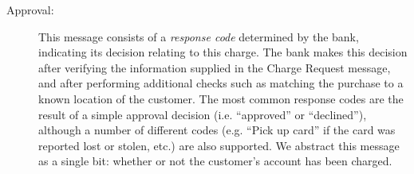 \begin{description}
\item[Approval:]
This message consists of a \emph{response code} determined by the bank, indicating its decision relating to this charge.
The bank makes this decision after verifying the information supplied in the Charge Request message, and after performing additional checks such as matching the purchase to a known location of the customer.
The most common response codes are the result of a simple approval decision (i.e. ``approved'' or ``declined''),
although a number of different codes (e.g. ``Pick up card'' if the card was reported lost or stolen, etc.) are also supported.
We abstract this message as a single bit: whether or not the customer's account has been charged.

\end{description}
